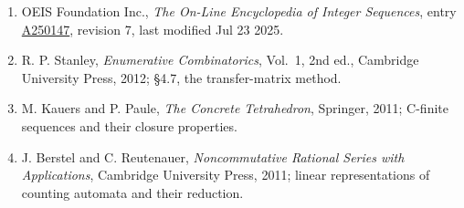 \documentclass[11pt]{article}
\theoremstyle{definition}
\begin{document}
\begin{enumerate}

\item OEIS Foundation Inc., \emph{The On-Line Encyclopedia of Integer Sequences}, entry \href{https://oeis.org/A250147}{A250147}, revision 7, last modified Jul 23 2025.

\item R. P. Stanley, \emph{Enumerative Combinatorics}, Vol.~1, 2nd ed., Cambridge University Press, 2012; \S4.7, the transfer-matrix method.

\item M. Kauers and P. Paule, \emph{The Concrete Tetrahedron}, Springer, 2011; C-finite sequences and their closure properties.

\item J. Berstel and C. Reutenauer, \emph{Noncommutative Rational Series with Applications}, Cambridge University Press, 2011; linear representations of counting automata and their reduction.

\end{enumerate}
\end{document}
